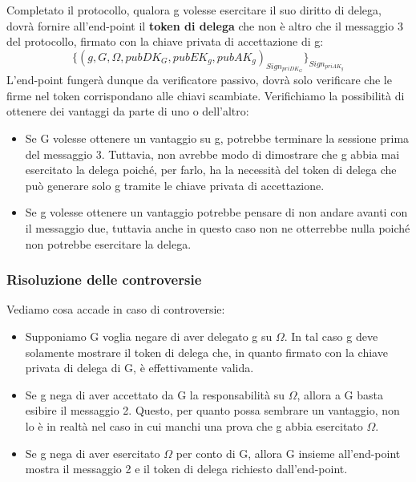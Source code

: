 Completato il protocollo, qualora g volesse esercitare il suo diritto di delega, dovrà fornire all'end-point il \textbf{token di delega} che non è altro che il messaggio 3 del protocollo, firmato con la chiave privata di accettazione di g:
\[\{(g,G,\Omega, pubDK_G,pubEK_g,pubAK_g)_{Sign_{priDK_G}}\}_{Sign_{priAK_g}}\]
L'end-point fungerà dunque da verificatore passivo, dovrà solo verificare che le firme nel token corrispondano alle chiavi scambiate.
Verifichiamo la possibilità di ottenere dei vantaggi da parte di uno o dell'altro:
\begin{itemize}
    \item Se G volesse ottenere un vantaggio su g, potrebbe terminare la sessione prima del messaggio 3. Tuttavia, non avrebbe modo di dimostrare che g abbia mai esercitato la delega poiché, per farlo, ha la necessità del token di delega che può generare solo g tramite le chiave privata di accettazione.
    \item Se g volesse ottenere un vantaggio potrebbe pensare di non andare avanti con il messaggio due, tuttavia anche in questo caso non ne otterrebbe nulla poiché non potrebbe esercitare la delega.
\end{itemize}
\subsubsection{Risoluzione delle controversie}
Vediamo cosa accade in caso di controversie:
\begin{itemize}
    \item Supponiamo G voglia negare di aver delegato g su $\Omega$. In tal caso g deve solamente mostrare il token di delega che, in quanto firmato con la chiave privata di delega di G, è effettivamente valida.
    \item Se g nega di aver accettato da G la responsabilità su $\Omega$, allora a G basta esibire il messaggio 2. Questo, per quanto possa sembrare un vantaggio, non lo è in realtà nel caso in cui manchi una prova che g abbia esercitato $\Omega$.
    \item Se g nega di aver esercitato $\Omega$ per conto di G, allora G insieme all'end-point mostra il messaggio 2 e il token di delega richiesto dall'end-point.
\end{itemize}
